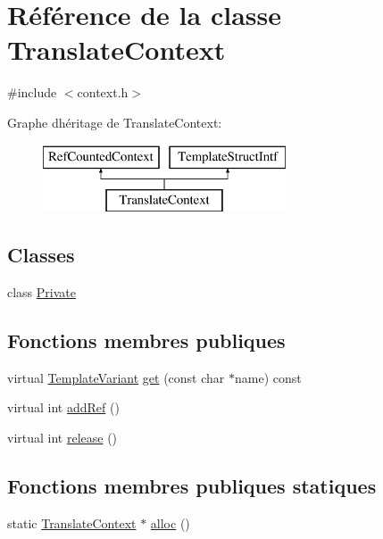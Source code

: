 \hypertarget{class_translate_context}{}\section{Référence de la classe Translate\+Context}
\label{class_translate_context}


{\ttfamily \#include $<$context.\+h$>$}

Graphe d\textquotesingle{}héritage de Translate\+Context\+:\begin{figure}[H]
\begin{center}
\leavevmode
\includegraphics[height=2.000000cm]{class_translate_context}
\end{center}
\end{figure}
\subsection*{Classes}
\begin{DoxyCompactItemize}
\item 
class \hyperlink{class_translate_context_1_1_private}{Private}
\end{DoxyCompactItemize}
\subsection*{Fonctions membres publiques}
\begin{DoxyCompactItemize}
\item 
virtual \hyperlink{class_template_variant}{Template\+Variant} \hyperlink{class_translate_context_aa0de7c27fd3cf80a0995d23e9af035bd}{get} (const char $\ast$name) const 
\item 
virtual int \hyperlink{class_translate_context_a8c6e3af2496041690177372ac2bf56cf}{add\+Ref} ()
\item 
virtual int \hyperlink{class_translate_context_a1fa557ada4404a339cae9d011074a56b}{release} ()
\end{DoxyCompactItemize}
\subsection*{Fonctions membres publiques statiques}
\begin{DoxyCompactItemize}
\item 
static \hyperlink{class_translate_context}{Translate\+Context} $\ast$ \hyperlink{class_translate_context_a3f97bc1e7988d9cae10c06e2bdde332b}{alloc} ()
\end{DoxyCompactItemize}


